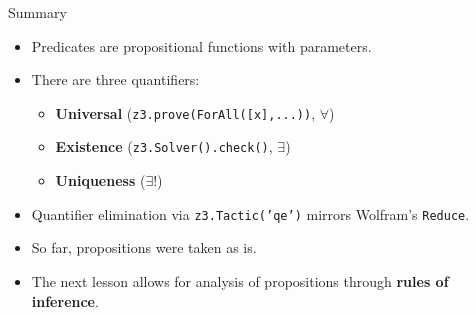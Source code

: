 \documentclass[aspectratio=169]{beamer}
\begin{document}
\begin{frame}{Summary}
  \begin{itemize}
    \item Predicates are propositional functions with parameters.
    \item There are three quantifiers:
    \begin{itemize}
      \item \textbf{Universal} \quad(\texttt{z3.prove(ForAll([x],\;...))},\; $\forall$)
      \item \textbf{Existence} \quad(\texttt{z3.Solver().check()},\; $\exists$)
      \item \textbf{Uniqueness} \quad($\exists!$)
    \end{itemize}
    \item Quantifier elimination via \texttt{z3.Tactic('qe')} mirrors Wolfram's \texttt{Reduce}.
    \item So far, propositions were taken as is.
    \item The next lesson allows for analysis of propositions through
          \textbf{rules of inference}.
  \end{itemize}
\end{frame}
\end{document}
